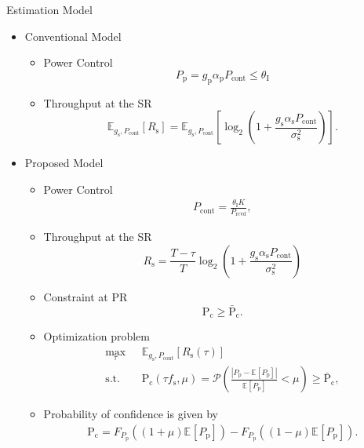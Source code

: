 \documentclass[12pt]{beamer}
\newcommand{\e}[2]{{\mathbb E}_{#1}\left[ #2 \right]}
\newcommand{\p}{\mathcal P}
\newcommand{\sub}[1]{_{\text{#1}}}
\newcommand{\pc}{\text{P}\sub{c}}
\newcommand{\pcd}{\bar{\text{P}}\sub{c}}
\newcommand{\preg}{P\sub{cont}}
\newcommand{\prcvd}{P\sub{rcvd}}
\newcommand{\pp}{P\sub{p}}
\newcommand{\ite}{\theta\sub{I}}
\newcommand{\rs}{R\sub{s}}
\newcommand{\gp}{g\sub{p}}
\newcommand{\gs}{g\sub{s}}
\newcommand{\ap}{\alpha\sub{p}}
\newcommand{\as}{\alpha\sub{s}}
\newcommand{\nps}{\sigma^2\sub{s}}
\newcommand{\fsam}{f\sub{s}}
\newcommand{\fpp}{F_{\pp}}
\newcommand{\fs}[2]{\fontsize{#1 pt}{#2}\selectfont}
\DeclareMathOperator*{\maxi}{max}
\begin{document}
\begin{frame}[t]{Estimation Model}
	\begin{itemize}
	\fs{8}{8}
        \item Conventional Model
	\begin{itemize}
		\fs{8}{8}
		\item Power Control 
		     \begin{equation*}
			\pp = \gp \ap \preg \le \ite 
		     \end{equation*}
		\item Throughput at the SR 
		\begin{equation*}
			\e{\gs, \preg}{\rs} = \e{\gs, \preg}{\log_2 \left(1 + \frac{\gs \as \preg}{\nps} \right)}. 
		\end{equation*}
	\end{itemize} 
	\item Proposed Model 
	{
		\begin{itemize}
			\fs{8}{8}
			\item Power Control
			\begin{align*}
				\preg = \frac{\ite K}{\prcvd}, 
			\end{align*}
			\item Throughput at the SR
			\begin{equation*}
				\rs = \frac{T - \tau}{T} \log_2 \left(1 + \frac{\gs \as \preg }{\nps} \right) 
			\end{equation*}
			\item Constraint at PR
			\begin{equation*}
				\pc \ge \pcd.
			\end{equation*}
		\end{itemize}
	}
	{
		\begin{itemize}
			\fs{8}{8}
			\item Optimization problem
			\begin{align*}
				\maxi_{\tau}  & \text{      } \e{\gs, \preg}{\rs(\tau)} \\
				\text{s.t.} & \text{ } \pc(\tau \fsam, \mu) = \p \left( \frac{\left| \pp - \e{}{\pp} \right|}{\e{}{\pp}} < \mu \right) \ge \pcd, \nonumber  
			\end{align*}
			\item Probability of confidence is given by 
			\begin{align*}
				\pc = \fpp\left( {(1 + \mu) \e{}{\pp}}\right)  - \fpp\left({(1 - \mu) \e{}{\pp}} \right). 
			\end{align*}
		\end{itemize}		
	}
	\end{itemize}
\end{frame}
\end{document}
